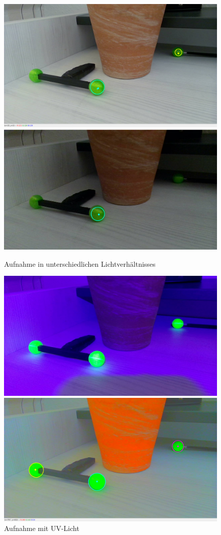 \documentclass[12pt]{article}
\begin{document}
\begin{figure}
\centering
  \includegraphics[angle=0,width=\linewidth]{2d-normal.jpg}
  \includegraphics[angle=0,width=\linewidth]{2d-normal-dark.jpg}
  \caption{Aufnahme in unterschiedlichen Lichtverhältnisses}
  \includegraphics[angle=0,width=\linewidth]{2d-uv-normal.jpg}
  \caption{Aufnahme mit UV-Licht}
  \includegraphics[angle=0,width=\linewidth]{2d-color.jpg}

\end{figure}
\end{document}
